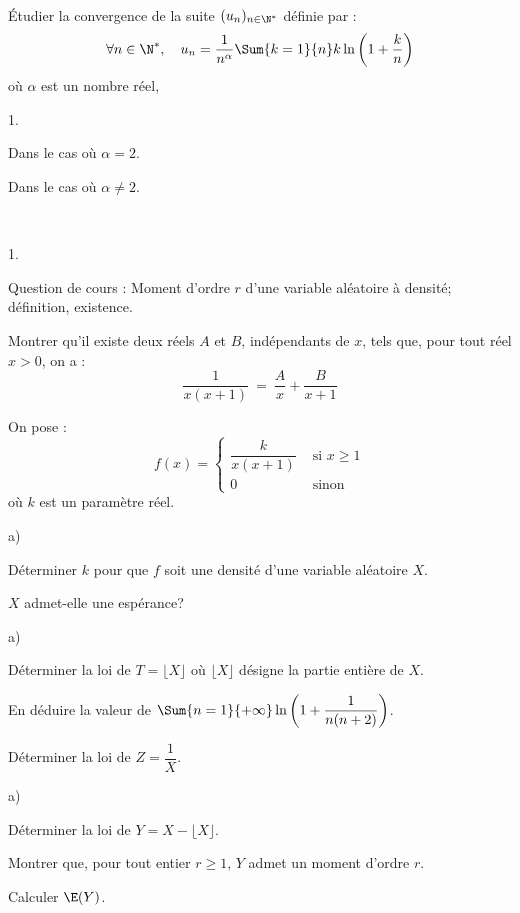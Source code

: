 \documentclass[11pt]{article}%
\begin{document}
\begin{exerciceSP}~\\
  Étudier la convergence de la suite $(u_n)_{n \in \N^* }$ définie par :
  \[
  \forall n \in \N^*,\ \ \ u_n = \frac{1}{n^{\alpha}} \Sum{k=1}{n} k
  \ln \left( 1 + \frac{k}{n} \right)
  \]
  où $\alpha$ est un nombre réel, \begin{noliste}{1.}
    \setlength{\itemsep}{2mm}
  \item Dans le cas où $\alpha = 2$.
  \item Dans le cas où $\alpha \neq 2$.

  \end{noliste}
\end{exerciceSP}




\begin{exerciceAP}~
  \begin{noliste}{1.}
    \setlength{\itemsep}{2mm}
  \item Question de cours : Moment d'ordre $r$ d'une variable
    aléatoire à densité; définition, existence.
  \item Montrer qu'il existe deux réels $A$ et $B$, indépendants de
    $x$, tels que, pour tout réel $x > 0$, on a :
    \[
    \dfrac{1}{x (x+1)} \ = \ \dfrac{A}{x} + \dfrac{B}{x+1}
    \]
  \item On pose :
    \[
    f(x) = \left\{ 
      \begin{array}{cl} 
        \dfrac{k}{x(x+1)} & \text{ si } x \geq 1 
        \\[.4cm]
        0 & \text{ sinon } 
      \end{array} 
    \right.
    \]
    où $k$ est un paramètre réel. \begin{noliste}{a)}
    \setlength{\itemsep}{2mm}
    \item Déterminer $k$ pour que $f$ soit une densité d'une variable
      aléatoire $X$.
    \item $X$ admet-elle une espérance?
    \end{noliste}
  \item
    \begin{noliste}{a)}
    \setlength{\itemsep}{2mm}
    \item Déterminer la loi de $T = \lfloor X \rfloor$ où $\lfloor X
      \rfloor$ désigne la partie entière de $X$.
    \item En déduire la valeur de $\Sum{n=1}{+\infty} \ln \left( 1 +
        \dfrac{1}{n(n+2) } \right)$.
    \end{noliste}
  \item Déterminer la loi de $Z = \dfrac{1}{X}$.
  \item
    \begin{noliste}{a)}
    \setlength{\itemsep}{2mm}
    \item Déterminer la loi de $Y = X - \lfloor X \rfloor$. 
    \item Montrer que, pour tout entier $r \geq 1$, $Y$ admet un
      moment d'ordre $r$.
    \item Calculer $\E(Y)$. 
    \end{noliste} 
  \end{noliste}
\end{exerciceAP}
\end{document}
